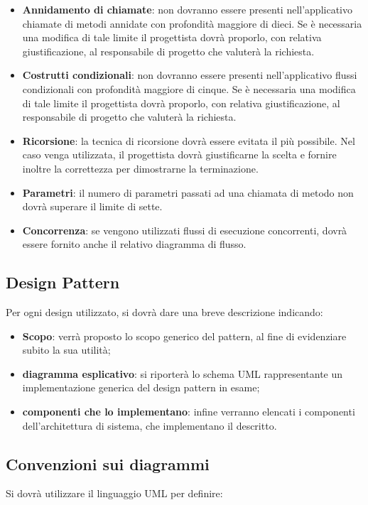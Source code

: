 {\begin{itemize}
\item \textbf{Annidamento di chiamate}: non dovranno essere presenti nell'applicativo chiamate di metodi annidate con profondità maggiore di dieci. Se è necessaria una modifica di tale limite il progettista dovrà proporlo, con relativa giustificazione, al responsabile di progetto che valuterà la richiesta.
\item \textbf{Costrutti condizionali}: non dovranno essere presenti nell'applicativo flussi condizionali con profondità maggiore di cinque. Se è necessaria una modifica di tale limite il progettista dovrà proporlo, con relativa giustificazione, al responsabile di progetto che valuterà la richiesta.
\item \textbf{Ricorsione}: la tecnica di ricorsione dovrà essere evitata il più possibile. Nel caso venga utilizzata, il progettista dovrà giustificarne la scelta e fornire inoltre la correttezza per dimostrarne la terminazione.
\item \textbf{Parametri}: il numero di parametri passati ad una chiamata di metodo non dovrà superare il limite di sette.
\item \textbf{Concorrenza}: se vengono utilizzati flussi di esecuzione concorrenti, dovrà essere fornito anche il relativo diagramma di flusso.
\end{itemize}

\subsection{Design Pattern}
\label{sec:design_patterns}
Per ogni design  utilizzato, si dovrà dare una breve descrizione indicando:
\begin{itemize}
\item \textbf{Scopo}: verrà proposto lo scopo generico del pattern, al fine di evidenziare subito la sua utilità;
\item \textbf{diagramma esplicativo}: si riporterà lo schema UML rappresentante un implementazione generica del design pattern in esame;
\item \textbf{componenti che lo implementano}: infine verranno elencati i componenti dell'architettura di sistema, che implementano il  descritto.
\end{itemize}

\subsection{Convenzioni sui diagrammi}
Si dovrà utilizzare il linguaggio UML per definire:
\begin{itemize}


\end{itemize}}
